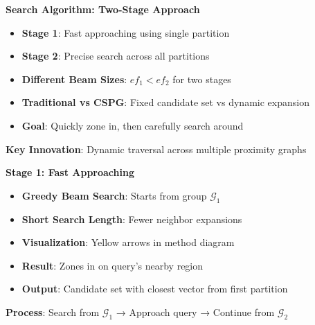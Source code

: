\begin{frame}
\begin{center}
\Large\textbf{Search Algorithm: Two-Stage Approach}
\end{center}

\vspace{0.3cm}

\begin{itemize}
    \item \textbf{Stage 1}: Fast approaching using single partition
    \item \textbf{Stage 2}: Precise search across all partitions
    \item \textbf{Different Beam Sizes}: $ef_1 < ef_2$ for two stages
    \item \textbf{Traditional vs CSPG}: Fixed candidate set vs dynamic expansion
    \item \textbf{Goal}: Quickly zone in, then carefully search around
\end{itemize}

\vspace{0.3cm}

\textbf{Key Innovation}: Dynamic traversal across multiple proximity graphs
\end{frame}%
\begin{frame}
\begin{center}
\Large\textbf{Stage 1: Fast Approaching}
\end{center}

\vspace{0.3cm}

\begin{itemize}
    \item \textbf{Greedy Beam Search}: Starts from group $\mathcal{G}_1$
    \item \textbf{Short Search Length}: Fewer neighbor expansions
    \item \textbf{Visualization}: Yellow arrows in method diagram
    \item \textbf{Result}: Zones in on query's nearby region
    \item \textbf{Output}: Candidate set with closest vector from first partition
\end{itemize}

\vspace{0.3cm}

\textbf{Process}: Search from $\mathcal{G}_1$ → Approach query → Continue from $\mathcal{G}_2$
\end{frame}%
